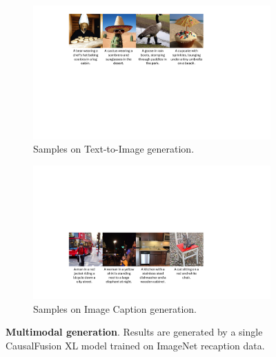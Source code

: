 \begin{figure}[h!]
    \centering
    \vspace{0pt}
    \begin{subfigure}{1\textwidth}
        \centering
        \includegraphics[width=\linewidth]{figs/t2i.pdf}
        \caption{Samples on Text-to-Image generation.}
        \label{fig:subfig1}
    \end{subfigure}

    \begin{subfigure}{1\textwidth}
        \centering
        \includegraphics[width=\linewidth]{figs/i2t.pdf}
        \caption{Samples on Image Caption generation.     \vspace{-5pt}
        }
        \label{fig:subfig2}
    \end{subfigure}
    \vspace{-5pt}
    \caption{\textbf{Multimodal generation}. Results are generated by a single CausalFusion XL model trained on ImageNet recaption data.
    \vspace{-10pt}
    }
    \label{fig:combined}
\end{figure}



